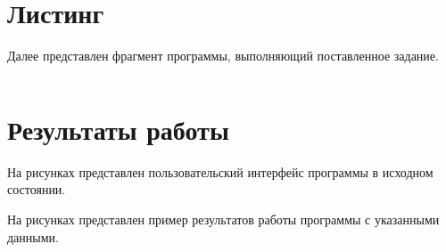 \documentclass[14pt]{extreport}
\begin{document}
\section{Листинг}

Далее представлен фрагмент программы, выполняющий поставленное задание.

\begin{lstlisting}

\end{lstlisting}

\section{Результаты работы}

На рисунках  представлен пользовательский интерфейс программы в исходном состоянии.



На рисунках  представлен пример результатов работы программы с указанными данными.
\end{document}
